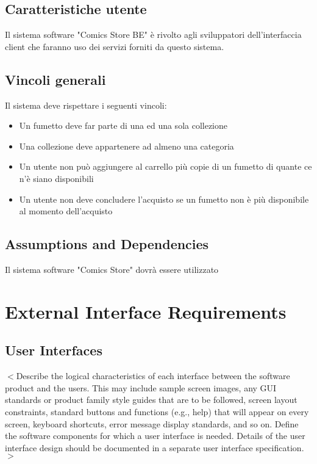\documentclass{scrreprt}
\begin{document}
\section{Caratteristiche utente}
Il sistema software "Comics Store BE" è rivolto agli sviluppatori dell'interfaccia client che faranno
uso dei servizi forniti da questo sistema.

\section{Vincoli generali}
Il sistema deve rispettare i seguenti vincoli:
\begin{itemize}
    \item Un fumetto deve far parte di una ed una sola collezione
    \item Una collezione deve appartenere ad almeno una categoria
    \item Un utente non può aggiungere al carrello più copie di un fumetto di quante ce n'è siano disponibili
    \item Un utente non deve concludere l'acquisto se un fumetto non è più disponibile al momento dell'acquisto
\end{itemize}

\section{Assumptions and Dependencies}
Il sistema software "Comics Store" dovrà essere utilizzato


\chapter{External Interface Requirements}

\section{User Interfaces}
$<$Describe the logical characteristics of each interface between the software 
product and the users. This may include sample screen images, any GUI standards 
or product family style guides that are to be followed, screen layout 
constraints, standard buttons and functions (e.g., help) that will appear on 
every screen, keyboard shortcuts, error message display standards, and so on.  
Define the software components for which a user interface is needed. Details of 
the user interface design should be documented in a separate user interface 
specification.$>$
\end{document}
